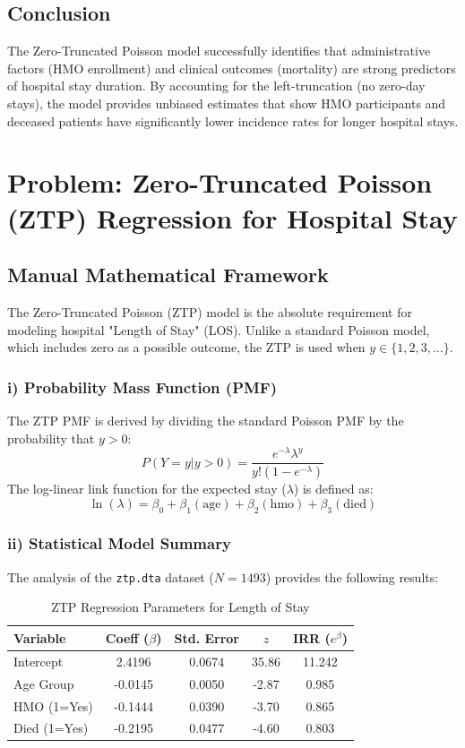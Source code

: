 \documentclass[12pt]{article}
\begin{document}
\subsection{Conclusion}
The Zero-Truncated Poisson model successfully identifies that administrative factors (HMO enrollment) and clinical outcomes (mortality) are strong predictors of hospital stay duration. By accounting for the left-truncation (no zero-day stays), the model provides unbiased estimates that show HMO participants and deceased patients have significantly lower incidence rates for longer hospital stays.

\newpage
\section{Problem: Zero-Truncated Poisson (ZTP) Regression for Hospital Stay}

\subsection{Manual Mathematical Framework}
The Zero-Truncated Poisson (ZTP) model is the absolute requirement for modeling hospital "Length of Stay" (LOS). Unlike a standard Poisson model, which includes zero as a possible outcome, the ZTP is used when $y \in \{1, 2, 3, \dots\}$.

\subsubsection{i) Probability Mass Function (PMF)}
The ZTP PMF is derived by dividing the standard Poisson PMF by the probability that $y > 0$:
\[ P(Y=y | y > 0) = \frac{e^{-\lambda} \lambda^y}{y! (1 - e^{-\lambda})} \]
The log-linear link function for the expected stay ($\lambda$) is defined as:
\[ \ln(\lambda) = \beta_0 + \beta_1 (\text{age}) + \beta_2 (\text{hmo}) + \beta_3 (\text{died}) \]

\subsubsection{ii) Statistical Model Summary}
The analysis of the \texttt{ztp.dta} dataset ($N=1493$) provides the following results:
\begin{table}[h!]
\centering
\caption{ZTP Regression Parameters for Length of Stay}
\begin{tabular}{@{}lcccc@{}}
\toprule
Variable & Coeff ($\beta$) & Std. Error & $z$ & IRR ($e^\beta$) \\ \midrule
Intercept & 2.4196 & 0.0674 & 35.86 & 11.242 \\
Age Group & -0.0145 & 0.0050 & -2.87 & 0.985 \\
HMO (1=Yes) & -0.1444 & 0.0390 & -3.70 & 0.865 \\
Died (1=Yes) & -0.2195 & 0.0477 & -4.60 & 0.803 \\ \bottomrule
\end{tabular}
\end{table}
\end{document}
